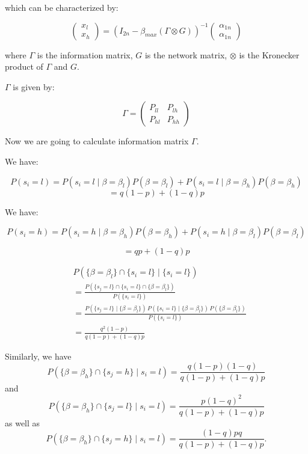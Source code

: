\documentclass[12pt]{article}
\begin{document}
which can be characterized by:

\[
\begin{pmatrix}
x_l \\
x_h
\end{pmatrix}
= \left( I_{2n} - \beta_{max} (\Gamma\otimes G) \right)^{-1}
\begin{pmatrix}
\alpha_{1n} \\
\alpha_{1n}
\end{pmatrix}
\]

where $\Gamma$ is the information matrix, $G$ is the network matrix, $\otimes$ is the Kronecker product of $\Gamma$ and $G$.

$\Gamma$ is given by:

\[
\Gamma = 
\begin{pmatrix}
P_{ll} & P_{lh} \\
P_{hl} & P_{hh}
\end{pmatrix}
\]

Now we are going to calculate information matrix $\Gamma$.

We have:

\[
P(s_i = l) = P(s_i = l \mid \beta = \beta_l)P(\beta = \beta_l) + P(s_i = l \mid \beta = \beta_h) P(\beta = \beta_h)
\]
\[
=q(1-p)+(1-q)p
\]

We have:

\[
P(s_i = h) = P(s_i = h \mid \beta = \beta_h)P(\beta = \beta_h) + P(s_i = h \mid \beta = \beta_l) P(\beta = \beta_l)
\]


\[
= qp+(1-q)p
\]



\begin{align*}
&P(\{ \beta = \beta_l\} \cap \{ s_i= l \} \mid \{ s_i = l \}) \\
&= \frac{P(\{ s_j = l \} \cap \{ s_i = l \} \cap \{ \beta = \beta_l \})}{P(\{ s_i = l \})} \\
&= \frac{P(\{ s_j = l \} \mid \{ \beta = \beta_l \}) \, P(\{ s_i = l \} \mid \{ \beta = \beta_l \}) \, P(\{ \beta = \beta_l\})}{P(\{ s_i = l \})} \\
&= \frac{q^2(1-p)}{q(1-p)+ (1 - q)p}
\end{align*}

Similarly, we have
\[
P(\{\beta = \beta_h\} \cap \{s_j = h\} \mid s_i = l) = \frac{q(1-p)(1-q)}{q(1-p) + (1-q)p}
\]
and
\[
P(\{\beta = \beta_h\} \cap \{s_j = l\} \mid s_i = l) = \frac{p(1-q)^2}{q(1-p) + (1-q)p}
\]
as well as
\[
P(\{\beta = \beta_h\} \cap \{s_j = h\} \mid s_i = l) = \frac{(1-q)pq}{q(1-p) + (1-q)p}.
\]
\end{document}
